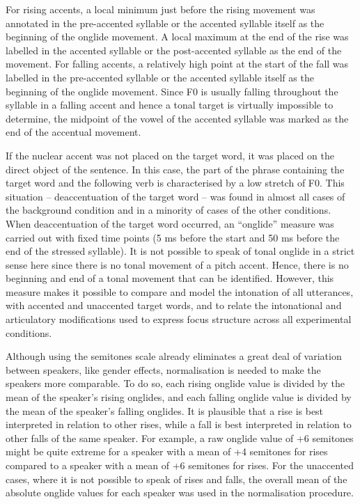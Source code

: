 For rising accents, a local minimum just before the rising movement was annotated in the pre-accented syllable or the accented syllable itself as the beginning of the onglide movement. A local maximum at the end of the rise was labelled in the accented syllable or the post-accented syllable as the end of the movement. For falling accents, a relatively high point at the start of the fall was labelled in the pre-accented syllable or the accented syllable itself as the beginning of the onglide movement. Since F0 is usually falling throughout the syllable in a falling accent and hence a tonal target is virtually impossible to determine, the midpoint of the vowel of the accented syllable was marked as the end of the accentual movement.

If the nuclear accent was not placed on the target word, it was placed on the direct object of the sentence. In this case, the part of the phrase containing the target word and the following verb is characterised by a low stretch of F0. This situation -- deaccentuation of the target word -- was found in almost all cases of the background condition and in a minority of cases of the other conditions. When deaccentuation of the target word occurred, an ``onglide” measure was carried out with fixed time points (5 ms before the start and 50 ms before the end of the stressed syllable). It is not possible to speak of tonal onglide in a strict sense here since there is no tonal movement of a pitch accent. Hence, there is no beginning and end of a tonal movement that can be identified. However, this measure makes it possible to compare and model the intonation of all utterances, with accented and unaccented target words, and to relate the intonational and articulatory modifications used to express focus structure across all experimental conditions.

Although using the semitones scale already eliminates a great deal of variation between speakers, like gender effects, normalisation is needed to make the speakers more comparable. To do so, each rising onglide value is divided by the mean of the speaker’s rising onglides, and each falling onglide value is divided by the mean of the speaker’s falling onglides. It is plausible that a rise is best interpreted in relation to other rises, while a fall is best interpreted in relation to other falls of the same speaker. For example, a raw onglide value of +6 semitones might be quite extreme for a speaker with a mean of +4 semitones for rises compared to a speaker with a mean of +6 semitones for rises. For the unaccented cases, where it is not possible to speak of rises and falls, the overall mean of the absolute onglide values for each speaker was used in the normalisation procedure.

